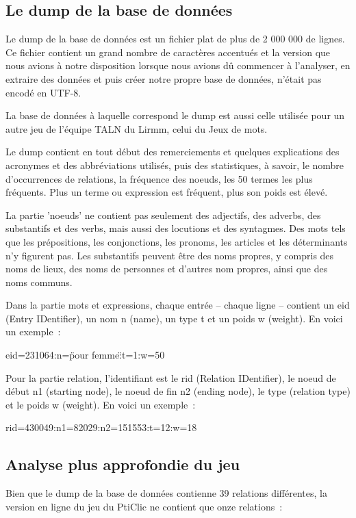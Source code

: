 \documentclass[a4paper,11pt,french]{article}
\begin{document}
\subsection{Le dump de la base de données}

Le dump de la base de données est un fichier plat de plus de 2 000 000 de lignes. Ce fichier contient un grand nombre de caractères accentués et la version que nous avions à notre disposition lorsque nous avions dû commencer à l'analyser, en extraire des données et puis créer notre propre base de données, n'était pas encodé en UTF-8.

La base de données à laquelle correspond le dump est aussi celle utilisée pour un autre jeu de l'équipe TALN du Lirmm, celui du Jeux de mots. 

Le dump contient en tout début des remerciements et quelques explications des acronymes et des abbréviations utilisés, puis des statistiques, à savoir, le nombre d'occurrences de relations, la fréquence des noeuds, les 50 termes les plus fréquents. Plus un terme ou expression est fréquent, plus son poids est élevé. 


La partie 'noeuds' ne contient pas seulement des adjectifs, des adverbs, des substantifs et des verbs, mais aussi des locutions et des syntagmes. Des mots tels que les prépositions, les conjonctions, les pronoms, les articles et les déterminants n'y figurent pas. Les substantifs peuvent être des noms propres, y compris des noms de lieux, des noms de personnes et d'autres nom propres, ainsi que des noms communs. 

Dans la partie mots et expressions, chaque entrée -- chaque ligne -- contient un eid (Entry IDentifier), un nom n (name), un type t et un poids w (weight). En voici un exemple~:

eid=231064:n=\"pour femme\":t=1:w=50

Pour la partie relation, l'identifiant est le rid (Relation IDentifier), le noeud de début n1 (starting node), le noeud de fin n2 (ending node), le type (relation type) et le poids w (weight). En voici un exemple~:

rid=430049:n1=82029:n2=151553:t=12:w=18


\subsection{Analyse plus approfondie du jeu}
Bien que le dump de la base de données contienne 39 relations différentes, la version en ligne du jeu du PtiClic ne contient que onze relations~:
\end{document}
